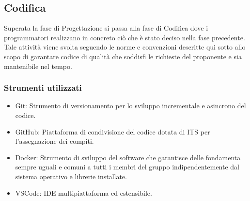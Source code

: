 \subsection{Codifica}
Superata la fase di Progettazione si passa alla fase di Codifica dove i programmatori
realizzano in concreto ciò che è stato deciso nella fase precedente.
Tale attività viene svolta seguendo le norme e convenzioni descritte qui sotto allo
scopo di garantare codice di qualità che soddisfi le richieste del proponente e sia mantenibile nel tempo.

\subsubsection{Strumenti utilizzati}
    \begin{itemize}
    \item Git: Strumento di versionamento per lo sviluppo incrementale e asincrono del codice.
    \item GitHub: Piattaforma di condivisione del codice dotata di ITS per l'assegnazione dei compiti.
    \item Docker: Strumento di sviluppo del software che garantisce delle fondamenta sempre uguali
      e comuni a tutti i membri del gruppo indipendentemente dal sistema operativo e librerie installate.
    \item VSCode: IDE multipiattaforma ed estensibile.
    \end{itemize}
